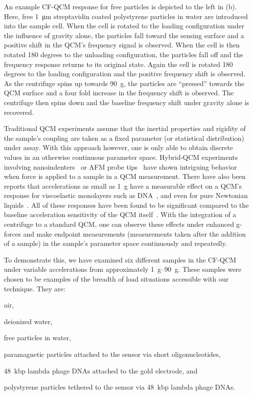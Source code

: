 An example CF-QCM response for free particles is depicted to the left in
(b).  Here, free \SI{1}{\micro\meter} streptavidin
coated polystyrene particles in water are introduced into the sample cell.
When the cell is rotated to the loading configuration under the influence
of gravity alone, the particles fall toward the sensing surface and a positive
shift in the QCM's frequency signal is observed.  When the cell is then
rotated 180 degrees to the unloading configuration, the particles fall off
and the frequency response returns to its original state.  Again the cell
is rotated 180 degrees to the loading configuration and the positive
frequency shift is observed.  As the centrifuge spins up towards
\SI{90}{g}, the particles are ``pressed'' towards the QCM surface and a
four fold increase in the frequency shift is observed.  The centrifuge then
spins down and the baseline frequency shift under gravity alone is
recovered.

Traditional QCM experiments assume that the inertial properties and
rigidity of the sample's coupling are taken as a fixed parameter (or
statistical distribution) under assay.  With this approach however, one is
only able to obtain discrete values in an otherwise continuous parameter space.  Hybrid-QCM experiments
involving nanoindenters~\cite{borovsky2001measuring} or AFM probe
tips~\cite{richter2003pathways} have shown intriguing behavior when force
is applied to a sample in a QCM measurement.  There have also been reports
that accelerations as small as \SI{1}{g} have a measurable effect on a
QCM's response for viscoelastic monolayers such as
DNA~\cite{fawcett2004evidence}, and even for pure Newtonian
liquids~\cite{yoshimoto2002effect}.  All of these responses have been found
to be significant compared to the baseline acceleration sensitivity of the
QCM itself~\cite{filler1988acceleration}.  With the integration of a
centrifuge to a standard QCM, one can observe these effects under enhanced
g-forces and make endpoint measurements (measurements taken after the
addition of a sample) in the sample's parameter space continuously and
repeatedly.

To demonstrate this, we have examined six different samples in the CF-QCM
under variable accelerations from approximately \SIrange{1}{90}{g}.  These
samples were chosen to be examples of the breadth of load situations
accessible with our technique.  They are:
\begin{inparaenum}[(a)]
\item air,
\item deionized water,
\item free particles in water,
\item paramagnetic particles attached to the sensor via short oligonucleotides,
\item \SI{48}{kbp} lambda phage DNAs attached to the gold electrode, and
\item polystyrene particles tethered to the sensor via \SI{48}{kbp} lambda phage DNAs.
\end{inparaenum}


